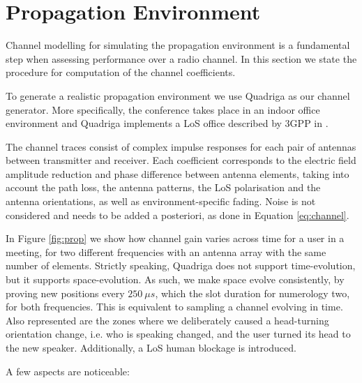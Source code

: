 \section{Propagation Environment}
\label{sec:propagation_environment}

Channel modelling for simulating the propagation environment is a fundamental step when assessing performance over a radio channel. In this section we state the procedure for computation of the channel coefficients. 

To generate a realistic propagation environment we use Quadriga as our channel generator. More specifically, the conference takes place in an indoor office environment and Quadriga implements a LoS office described by 3GPP in \cite{3gpp_antennas}. 

The channel traces consist of complex impulse responses for each pair of antennas between transmitter and receiver. Each coefficient corresponds to the electric field amplitude reduction and phase difference between antenna elements, taking into account the path loss, the antenna patterns, the LoS polarisation and the antenna orientations, as well as environment-specific fading. Noise is not considered and needs to be added a posteriori, as done in Equation \ref{eq:channel}.

In Figure \ref{fig:prop} we show how channel gain varies across time for a user in a meeting, for two different frequencies with an antenna array with the same number of elements. Strictly speaking, Quadriga does not support time-evolution, but it supports space-evolution. As such, we make space evolve consistently, by proving new positions every $250 \ \mu s$, which the slot duration for numerology two, for both frequencies. This is equivalent to sampling a channel evolving in time. Also represented are the zones where we deliberately caused a head-turning orientation change, i.e. who is speaking changed, and the user turned its head to the new speaker. Additionally, a LoS human blockage is introduced.


A few aspects are noticeable:

